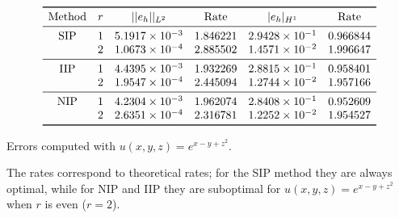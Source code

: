 \documentclass[12pt, a4paper]{article}
\begin{document}
\begin{table}[h]
	\centering
	\[
	\begin{array}{cccccc}
	\toprule
	\text{Method} & r & ||e_{h}||_{L^2} & \text{Rate} & |e_{h}|_{H^1} & \text{Rate} \\ 
	\midrule
	\text{SIP} & 1 & 5.1917 \times 10^{-3} & 1.846221 & 2.9428 \times 10^{-1} & 0.966844\\
	& 2 & 1.0673 \times 10^{-4} & 2.885502 & 1.4571\times 10^{-2} & 1.996647\\
	\midrule
	\text{IIP} & 1 & 4.4395 \times 10^{-3} & 1.932269 & 2.8815 \times 10^{-1} & 0.958401\\
	& 2 & 1.9547 \times 10^{-4} & 2.445094 & 1.2744 \times 10^{-2} & 1.957166\\
	\midrule
	\text{NIP} & 1 & 4.2304 \times 10^{-3} & 1.962074 & 2.8408 \times 10^{-1} & 0.952609\\
	& 2 & 2.6351 \times 10^{-4} & 2.316781 & 1.2252 \times 10^{-2} & 1.954527\\
	\bottomrule
	\end{array}
	\]
	\caption{Errors computed with $u(x,y,z) = e^{x-y+z^{2}}$.}
\end{table}

The rates correspond to theoretical rates; for the SIP method they are always optimal, while for NIP and IIP they are suboptimal for $u(x,y,z) = e^{x-y+z^{2}}$ when $r$ is even ($r=2$).
\end{document}
